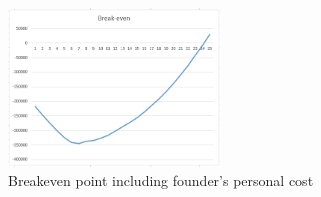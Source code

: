 \begin{figure}[H]
    \centering
    \includegraphics[width=0.5\textwidth]{figures/breakeven_salary.png}
    \caption{Breakeven point including founder's personal cost}
    \label{fig:breakeven_salary}
\end{figure}